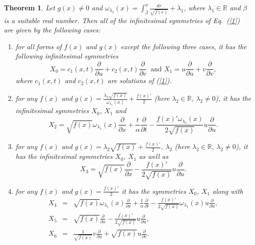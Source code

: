 \documentclass[12pt]{amsart}
\newtheorem{theorem}{Theorem}[section]
\begin{document}
\begin{theorem}\label{thm_symm}
Let $g(x)\neq 0$ and $\omega_{\lambda_1}(x)=\int_\beta^x \frac{dr}{\sqrt{f(r)}} +\lambda_1$, where $\lambda_1\in \mathbb{R}$ and $\beta$ is a suitable real number. Then all of the infinitesimal symmetries of Eq.~(\ref{1}) are given by the following cases:
\begin{enumerate}[label=(\roman*)]
    \item  for all forms of $f(x)$ and $ g(x)$ except the following three cases, it has the following infinitesimal symmetries
    \begin{equation*}
    X_0 = c_1(x,t)\frac{\partial}{\partial u}+c_2(x,t)\frac{\partial}{\partial v}~\mbox{ and }
    X_1 = u\frac{\partial}{\partial u}+v\frac{\partial}{\partial v},
    \end{equation*}
    where $c_1(x,t)$ and $c_2(x,t)$ are solutions of (\ref{1}).
    \item  for any $f(x)$ and $g(x)=\frac{\lambda_2 \sqrt{f(x)}}{\omega_{\lambda_1}(x)}+\frac{f(x)'}{2}$ (here $\lambda_2\in \mathbb{R},~ \lambda_2\ne 0$), it has the infinitesimal symmetries $X_0$, $X_1$ and
    \begin{equation*}
   X_2 = \sqrt{f(x)}\omega_{\lambda_1}(x)\frac{\partial}{\partial x}
+\frac{t}{\alpha}\frac{\partial}{\partial t}-\frac{f(x)'\omega_{\lambda_1}(x)}{2\sqrt{f(x)}}u \frac{\partial}{\partial u}.
    \end{equation*}
    \item for any $f(x)$ and $g(x)=\lambda_2 \sqrt{f(x)}+\frac{f(x)'}{2}, ~\lambda_2$ (here $\lambda_2\in \mathbb{R},~ \lambda_2\ne 0$), it has the infinitesimal symmetries $X_0$, $X_1$ as well as
    \begin{equation*}
    X_3=\sqrt{f(x)}\frac{\partial}{\partial x}-\frac{f(x)'}{2\sqrt{f(x)}}u\frac{\partial}{\partial u}.
    \end{equation*}
    \item for any $f(x)$ and $g(x)=\frac{f(x)'}{2}$ it has the symmetries $X_0$, $X_1$ along with
    \begin{eqnarray*}
     X_4&=&\sqrt{f(x)}\omega_{\lambda_1}(x) \frac{\partial}{\partial x}+\frac{t}{\alpha}\frac{\partial}{\partial t}-\frac{f(x)'}{2\sqrt{f(x)}}\omega_{\lambda_1}(x) u 
     \frac{\partial}{\partial u},\\
     X_5&=&\sqrt{f(x)}\frac{\partial}{\partial x}-\frac{f(x)'}{2\sqrt{f(x)}}u\frac{\partial}{\partial u},\\
    X_6&=&\frac{1}{\sqrt{f(x)}}v\frac{\partial}{\partial u}+\sqrt{f(x)}u\frac{\partial}{\partial v}.
    \end{eqnarray*}
\end{enumerate}
\end{theorem}
\end{document}
